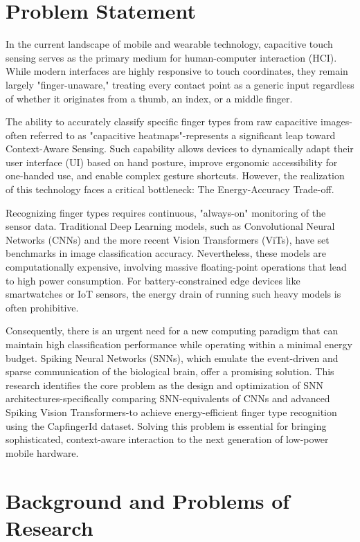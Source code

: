 \documentclass[../main.tex]{subfiles}
\begin{document}
\section{Problem Statement}
\label{sec:dvd}
In the current landscape of mobile and wearable technology, capacitive touch sensing serves as the primary medium for human-computer interaction (HCI). While modern interfaces are highly responsive to touch coordinates, they remain largely "finger-unaware," treating every contact point as a generic input regardless of whether it originates from a thumb, an index, or a middle finger.

The ability to accurately classify specific finger types from raw capacitive images-often referred to as "capacitive heatmaps"-represents a significant leap toward Context-Aware Sensing. Such capability allows devices to dynamically adapt their user interface (UI) based on hand posture, improve ergonomic accessibility for one-handed use, and enable complex gesture shortcuts. However, the realization of this technology faces a critical bottleneck: The Energy-Accuracy Trade-off.

Recognizing finger types requires continuous, "always-on" monitoring of the sensor data. Traditional Deep Learning models, such as Convolutional Neural Networks (CNNs) and the more recent Vision Transformers (ViTs), have set benchmarks in image classification accuracy. Nevertheless, these models are computationally expensive, involving massive floating-point operations that lead to high power consumption. For battery-constrained edge devices like smartwatches or IoT sensors, the energy drain of running such heavy models is often prohibitive.

Consequently, there is an urgent need for a new computing paradigm that can maintain high classification performance while operating within a minimal energy budget. Spiking Neural Networks (SNNs), which emulate the event-driven and sparse communication of the biological brain, offer a promising solution. This research identifies the core problem as the design and optimization of SNN architectures-specifically comparing SNN-equivalents of CNNs and advanced Spiking Vision Transformers-to achieve energy-efficient finger type recognition using the CapfingerId dataset. Solving this problem is essential for bringing sophisticated, context-aware interaction to the next generation of low-power mobile hardware. 


\section{Background and Problems of Research} 
\label{sec:giaiphap}
\end{document}
